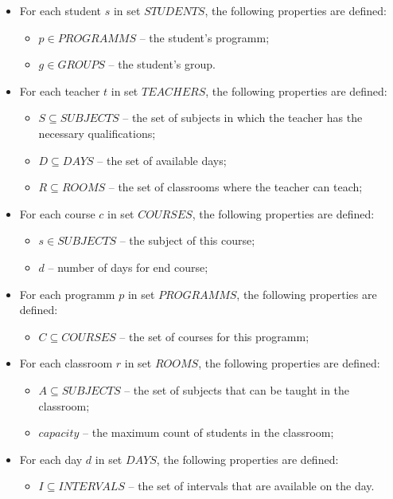 \documentclass{article}
\begin{document}
\begin{itemize}
    \setlength\itemsep{0.05em}
    \item For each student $s$ in set $STUDENTS$, the following properties are defined:
    \begin{itemize}
        \setlength\itemsep{0.05em}
        \item $p \in PROGRAMMS$ -- the student's programm;
        \item $g \in GROUPS$ -- the student's group.
    \end{itemize}

    \item For each teacher $t$ in set $TEACHERS$, the following properties are defined:
    \begin{itemize}
        \setlength\itemsep{0.05em}
        \item $S \subseteq SUBJECTS$ -- the set of subjects in which the teacher has the necessary qualifications;
        \item $D \subseteq DAYS$ -- the set of available days;
        \item $R \subseteq ROOMS$ -- the set of classrooms where the teacher can teach; 
    \end{itemize}

    \item For each course $c$ in set $COURSES$, the following properties are defined:
    \begin{itemize}
        \setlength\itemsep{0.05em}
        \item $s \in SUBJECTS$ -- the subject of this course;
        \item $d$ -- number of days for end course;
    \end{itemize}

    \item For each programm $p$ in set $PROGRAMMS$, the following properties are defined:
    \begin{itemize}
        \setlength\itemsep{0.05em}
        \item $C \subseteq COURSES$ -- the set of courses for this programm;
    \end{itemize}
    
    \item For each classroom $r$ in set $ROOMS$, the following properties are defined:
    \begin{itemize}
        \setlength\itemsep{0.05em}
        \item $A \subseteq SUBJECTS$ -- the set of subjects that can be taught in the classroom;
        \item $capacity$ -- the maximum count of students in the classroom;
    \end{itemize}

    \item For each day $d$ in set $DAYS$, the following properties are defined:
    \begin{itemize}
        \setlength\itemsep{0.05em}
        \item $I \subseteq INTERVALS$ -- the set of intervals that are available on the day.
    \end{itemize}

\end{itemize}
\end{document}

